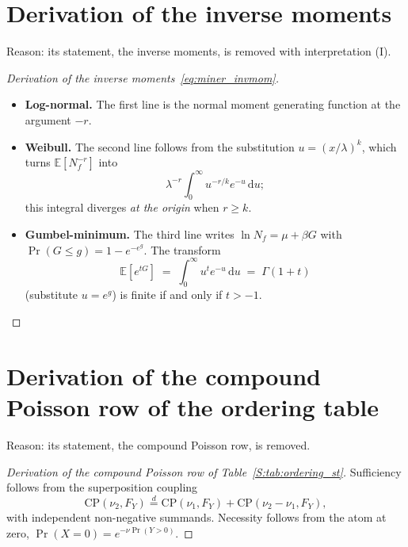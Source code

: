 \documentclass[11pt,a4paper]{article}
\theoremstyle{plain}
\theoremstyle{definition}
\theoremstyle{remark}
\begin{document}
\section{Derivation of the inverse moments}

Reason: its statement, the inverse moments, is removed with interpretation (I).

\label{drv:miner_invmom}
\begin{proof}[Derivation of the inverse moments~\eqref{eq:miner_invmom}]\leavevmode
\begin{itemize}
  \item \textbf{Log-normal.} The first line is the normal moment generating function at the argument $-r$.
  \item \textbf{Weibull.} The second line follows from the substitution $u = (x/\lambda)^k$, which turns $\mathbb{E}[N_f^{-r}]$ into
    \begin{equation}
      \lambda^{-r}\int_0^\infty u^{-r/k}e^{-u}\,\mathrm{d}u;
    \end{equation}
    this integral diverges \emph{at the origin} when $r \ge k$.
  \item \textbf{Gumbel-minimum.} The third line writes $\ln N_f = \mu + \beta G$ with $\Pr(G \le g) = 1 - e^{-e^{g}}$.
    The transform
    \begin{equation}
      \mathbb{E}[e^{tG}] \;=\; \int_0^\infty u^{t}e^{-u}\,\mathrm{d}u \;=\; \Gamma(1+t)
    \end{equation}
    (substitute $u = e^g$) is finite if and only if $t > -1$.
\end{itemize}
\end{proof}

\section{Derivation of the compound Poisson row of the ordering table}

Reason: its statement, the compound Poisson row, is removed.

\label{drv:order_cp}
\begin{proof}[Derivation of the compound Poisson row of Table~\ref{S:tab:ordering_st}]
Sufficiency follows from the superposition coupling
\begin{equation}
  \mathrm{CP}(\nu_2, F_Y) \stackrel{d}{=} \mathrm{CP}(\nu_1, F_Y) + \mathrm{CP}(\nu_2 - \nu_1, F_Y),
\end{equation}
with independent non-negative summands.
Necessity follows from the atom at zero, $\Pr(X = 0) = e^{-\nu \Pr(Y > 0)}$.
\end{proof}



\end{document}
